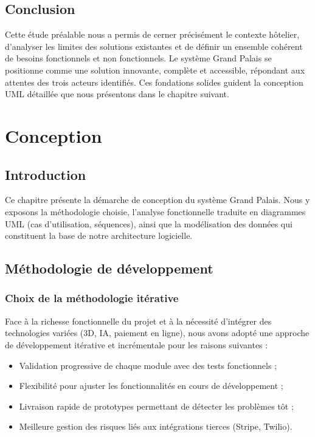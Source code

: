 \documentclass[12pt, a4paper]{report}
\begin{document}
\section{Conclusion}

Cette étude préalable nous a permis de cerner précisément le contexte hôtelier,
d'analyser les limites des solutions existantes et de définir un ensemble cohérent
de besoins fonctionnels et non fonctionnels. Le système Grand Palais se positionne
comme une solution innovante, complète et accessible, répondant aux attentes des
trois acteurs identifiés. Ces fondations solides guident la conception UML détaillée
que nous présentons dans le chapitre suivant.

\chapter{Conception}

\section{Introduction}

Ce chapitre présente la démarche de conception du système Grand Palais. Nous y
exposons la méthodologie choisie, l'analyse fonctionnelle traduite en diagrammes
UML (cas d'utilisation, séquences), ainsi que la modélisation des données qui
constituent la base de notre architecture logicielle.

\section{Méthodologie de développement}

\subsection{Choix de la méthodologie itérative}

Face à la richesse fonctionnelle du projet et à la nécessité d'intégrer des
technologies variées (3D, IA, paiement en ligne), nous avons adopté une approche
de développement itérative et incrémentale pour les raisons suivantes :
\begin{itemize}
  \item Validation progressive de chaque module avec des tests fonctionnels ;
  \item Flexibilité pour ajuster les fonctionnalités en cours de développement ;
  \item Livraison rapide de prototypes permettant de détecter les problèmes tôt ;
  \item Meilleure gestion des risques liés aux intégrations tierces (Stripe, Twilio).
\end{itemize}
\end{document}
